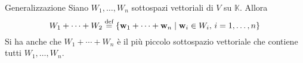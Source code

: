 \begin{SubDef}{Generalizzazione}
  Siano $W_1,\ldots,W_n$ sottospazi vettoriali di $V$ su $\mathbb{K}$. Allora
  \begin{equation*}
    W_1+\cdots+W_2\bydef\{\vec{w}_1+\cdots+\vec{w}_n\Setsuchthat \vec{w}_i\in
    W_i,\,i=1,\ldots,n\}
  \end{equation*}
  Si ha anche che $W_1+\cdots+W_n$ è il più piccolo sottospazio vettoriale che contiene
  tutti $W_1,\ldots,W_n$.
\end{SubDef}
